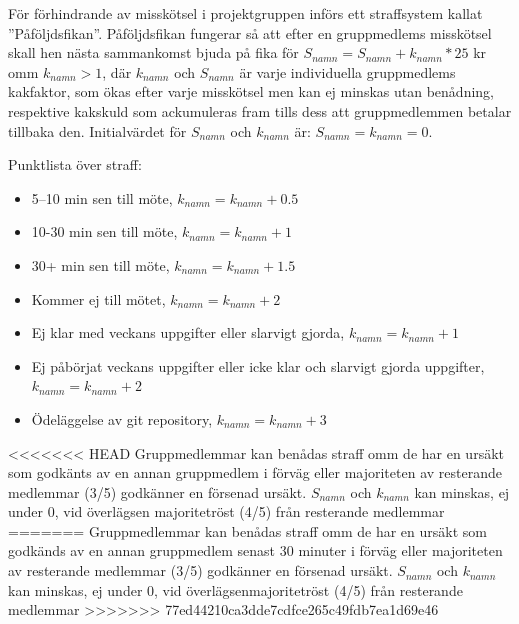 \documentclass[a4paper]{article}
\begin{document}
För förhindrande av misskötsel i projektgruppen införs ett straffsystem kallat ”Påföljdsfikan”. Påföljdsfikan fungerar så att efter en gruppmedlems misskötsel skall hen nästa sammankomst bjuda på fika för $S_{namn} = S_{namn} + k_{namn}*25$ kr omm $k_{namn}>1$, där $k_{namn}$ och $S_{namn}$ är varje individuella gruppmedlems kakfaktor, som ökas efter varje misskötsel men kan ej minskas utan benådning, respektive kakskuld som ackumuleras fram tills dess att gruppmedlemmen betalar tillbaka den. Initialvärdet för $S_{namn}$ och $k_{namn}$ är: $S_{namn}=k_{namn}=0.$\\ \par
Punktlista över straff:
\begin{itemize}
	\item 5–10 min sen till möte, $k_{namn} = k_{namn} + 0.5$
	\item 10-30 min sen till möte, $k_{namn} = k_{namn} + 1$
	\item 30+ min sen till möte, $k_{namn} = k_{namn} + 1.5$
	\item Kommer ej till mötet, $k_{namn} = k_{namn} + 2$
	\item Ej klar med veckans uppgifter eller slarvigt gjorda, $k_{namn} = k_{namn} + 1$
	\item Ej påbörjat veckans uppgifter eller icke klar och slarvigt gjorda uppgifter, \indent $k_{namn} = k_{namn} + 2$
	\item Ödeläggelse av git repository, $k_{namn} = k_{namn} + 3$
\end{itemize}
\par
<<<<<<< HEAD
Gruppmedlemmar kan benådas straff omm de har en ursäkt som godkänts av en annan gruppmedlem i förväg eller majoriteten av resterande medlemmar (3/5) godkänner en försenad ursäkt. $S_{namn}$ och $k_{namn}$ kan minskas, ej under 0, vid överlägsen majoritetröst (4/5) från resterande medlemmar
=======
Gruppmedlemmar kan benådas straff omm de har en ursäkt som godkänds av en annan gruppmedlem senast 30 minuter i förväg eller majoriteten av resterande medlemmar (3/5) godkänner en försenad ursäkt. $S_{namn}$ och $k_{namn}$ kan minskas, ej under 0, vid överlägsenmajoritetröst (4/5) från resterande medlemmar
>>>>>>> 77ed44210ca3dde7cdfce265c49fdb7ea1d69e46



%
%
\end{document}
